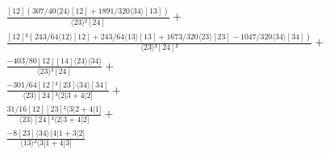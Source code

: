 \documentclass[varwidth, border=5pt]{standalone}
\begin{document}
\begin{my}
$\begin{gathered}
\scriptscriptstyle\frac{[12](307/40⟨24⟩[12]+1891/320⟨34⟩[13])}{⟨23⟩²[24]} +\\
\scriptscriptstyle\frac{[12]²(243/64⟨12⟩[12]+243/64⟨13⟩[13]+1673/320⟨23⟩[23]-1047/320⟨34⟩[34])}{⟨23⟩²[24]²} +\\
\scriptscriptstyle\frac{-403/80[12][14]⟨24⟩⟨34⟩}{⟨23⟩³[24]} +\\
\scriptscriptstyle\frac{-301/64[12]²[23]⟨34⟩[34]}{⟨23⟩[24]²⟨2|3+4|2]} +\\
\scriptscriptstyle\frac{31/16[12][23]²⟨3|2+4|1]}{⟨23⟩[24]²⟨2|3+4|2]} +\\
\scriptscriptstyle\frac{-8[23]⟨34⟩⟨4|1+3|2]}{⟨13⟩²⟨3|1+4|3]} \phantom{+}
\end{gathered}$
\end{my}
\end{document}

